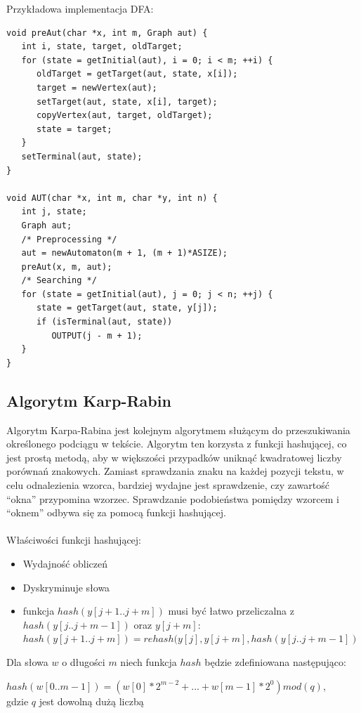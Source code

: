 \documentclass[a4paper,12pt]{article}
\begin{document}
Przykładowa implementacja DFA:
\begin{lstlisting}
void preAut(char *x, int m, Graph aut) {
   int i, state, target, oldTarget;
   for (state = getInitial(aut), i = 0; i < m; ++i) {
      oldTarget = getTarget(aut, state, x[i]);
      target = newVertex(aut);
      setTarget(aut, state, x[i], target);
      copyVertex(aut, target, oldTarget);
      state = target;
   }
   setTerminal(aut, state);
}
 
void AUT(char *x, int m, char *y, int n) {
   int j, state;
   Graph aut;
   /* Preprocessing */
   aut = newAutomaton(m + 1, (m + 1)*ASIZE);
   preAut(x, m, aut);
   /* Searching */
   for (state = getInitial(aut), j = 0; j < n; ++j) {
      state = getTarget(aut, state, y[j]);
      if (isTerminal(aut, state))
         OUTPUT(j - m + 1);
   }
}
\end{lstlisting}

\newpage

\subsection{Algorytm Karp-Rabin}

Algorytm Karpa-Rabina jest kolejnym algorytmem służącym do przeszukiwania określonego podciągu w tekście. Algorytm ten korzysta z funkcji hashującej, co jest prostą metodą, aby w większości przypadków uniknąć kwadratowej liczby porównań znakowych. Zamiast sprawdzania znaku na każdej pozycji tekstu, w celu odnalezienia wzorca, bardziej wydajne jest sprawdzenie, czy zawartość “okna” przypomina wzorzec. Sprawdzanie podobieństwa pomiędzy wzorcem i “oknem” odbywa się za pomocą funkcji hashującej.
\\ \\
Właściwości funkcji hashującej:
\begin{itemize}
\item Wydajność obliczeń
\item Dyskryminuje słowa
\item funkcja $hash(y[j+1 .. j+m])$ musi być łatwo przeliczalna z $hash(y[j .. j+m-1])$ oraz $y[j+m]$: \\
$hash(y[j+1 .. j+m]) = rehash(y[j], y[j+m], hash(y[j .. j+m-1])$
\end{itemize}

Dla słowa $w$ o długości $m$ niech funkcja $hash$ będzie zdefiniowana następująco:
\begin{center}
$hash(w[0 .. m-1]) = (w[0]*2^{m-2} + ... + w[m-1]*2^0)mod(q)$, \\ gdzie $q$ jest dowolną dużą liczbą
\end{center}
\end{document}
